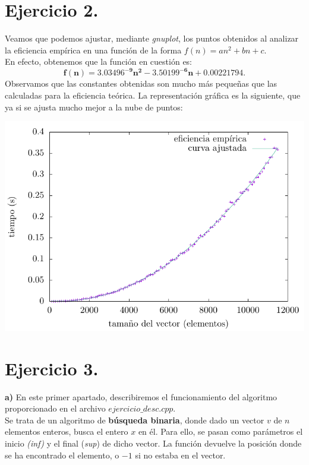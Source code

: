 \documentclass[11pt,a4paper]{article}
\newcommand{\bm}[1]{\boldsymbol{#1}}
\begin{document}
\section*{Ejercicio 2.}
Veamos que podemos ajustar, mediante \textit{gnuplot}, los puntos obtenidos al analizar la eficiencia empírica en una función de la forma $f(n) = an^2 + bn + c$.\\

En efecto, obtenemos que la función en cuestión es: $$\bm{f(n) = 3.03496^{-9}n^2 - 3.50199^{-6} n + 0.00221794}.$$ Observamos que las constantes obtenidas son mucho más pequeñas que las calculadas para la eficiencia teórica. La representación gráfica es la siguiente, que ya si se ajusta mucho mejor a la nube de puntos:

\begin{center}
	\includegraphics{img/tiempos_ordenacion_ajustado.pdf}
\end{center}

\section*{Ejercicio 3.}

\textbf{a)} En este primer apartado, describiremos el funcionamiento del algoritmo proporcionado en el archivo $ejercicio\_desc.cpp$.\\

Se trata de un algoritmo de \textbf{búsqueda binaria}, donde dado un vector $v$ de $n$ elementos enteros, busca el entero $x$ en él. Para ello, se pasan como parámetros el inicio \textit{(inf)} y el final (\textit{sup}) de dicho vector. La función devuelve la posición donde se ha encontrado el elemento, o $-1$ si no estaba en el vector.\\
\end{document}
